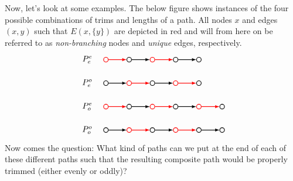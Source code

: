 Now, let's look at some examples.
The below figure shows instances of the four possible combinations of trims and lengths of a path.
All nodes $x$ and edges $(x,y)$ such that $E(x,\{ y\})$ are depicted in red and will from here on be referred to as \textit{non-branching} nodes and \textit{unique} edges, respectively.
\[
  \begin{tikzpicture}
    [
    point/.style={thick,circle,draw,inner sep=0pt,minimum size=2mm},
    trimmed/.style={thick,draw=red},
    untrimmed/.style={thick,draw=black}
    ]
    \node (0) at (0,0) [point,label=left:$\poo\quad$] {};
    \node (1) at (1,0) [point,trimmed] {};
    \node (2) at (2,0) [point] {};
    \node (3) at (3,0) [point,trimmed] {};
    \node (4) at (4,0) [point] {};
    \node (5) at (5,0) [point] {};
    \draw [-latex,untrimmed] (0) to (1);
    \draw [-latex,trimmed] (1) to (2);
    \draw [-latex,untrimmed] (2) to (3);
    \draw [-latex,trimmed] (3) to (4);
    \draw [-latex,untrimmed] (4) to (5);

    \node (0) at (0,1) [point,trimmed,label=left:$\peo\quad$] {};
    \node (1) at (1,1) [point] {};
    \node (2) at (2,1) [point,trimmed] {};
    \node (3) at (3,1) [point] {};
    \node (4) at (4,1) [point,trimmed] {};
    \node (5) at (5,1) [point] {};
    \draw [-latex,trimmed] (0) to (1);
    \draw [-latex,untrimmed] (1) to (2);
    \draw [-latex,trimmed] (2) to (3);
    \draw [-latex,untrimmed] (3) to (4);
    \draw [-latex,trimmed] (4) to (5);

    \node (0) at (0,2) [point,label=left:$\poe\quad$] {};
    \node (1) at (1,2) [point,trimmed] {};
    \node (2) at (2,2) [point] {};
    \node (3) at (3,2) [point,trimmed] {};
    \node (4) at (4,2) [point] {};
    \draw [-latex,untrimmed] (0) to (1);
    \draw [-latex,trimmed] (1) to (2);
    \draw [-latex,untrimmed] (2) to (3);
    \draw [-latex,trimmed] (3) to (4);

    \node (0) at (0,3) [point,trimmed,label=left:$\pee\quad$] {};
    \node (1) at (1,3) [point] {};
    \node (2) at (2,3) [point,trimmed] {};
    \node (3) at (3,3) [point] {};
    \node (4) at (4,3) [point] {};
    \draw [-latex,trimmed] (0) to (1);
    \draw [-latex,untrimmed] (1) to (2);
    \draw [-latex,trimmed] (2) to (3);
    \draw [-latex,untrimmed] (3) to (4);
  \end{tikzpicture}
\]
Now comes the question:
What kind of paths can we put at the end of each of these different paths such that the resulting composite path would be properly trimmed (either evenly or oddly)?

